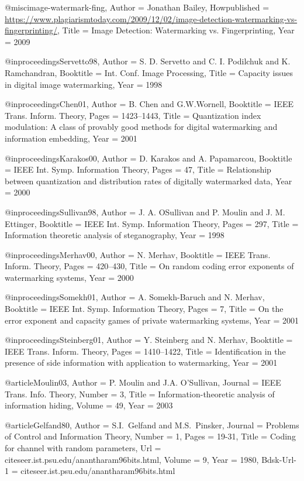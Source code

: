 {{@misc{image-watermark-fing,
	Author = {Jonathan Bailey},
	Howpublished = {\url{https://www.plagiarismtoday.com/2009/12/02/image-detection-watermarking-vs-fingerprinting/}},
	Title = {{Image Detection: Watermarking vs. Fingerprinting}},
	Year = {2009}}

@inproceedings{Servetto98,
	Author = {S. D. Servetto and C. I. Podilchuk and K. Ramchandran},
	Booktitle = {Int. Conf. Image Processing},
	Title = {Capacity issues in digital image watermarking},
	Year = {1998}}

@inproceedings{Chen01,
	Author = {B. Chen and G.W.Wornell},
	Booktitle = {IEEE Trans. Inform. Theory},
	Pages = {1423--1443},
	Title = {Quantization index modulation: A class of provably good methods for digital watermarking and information embedding},
	Year = {2001}}

@inproceedings{Karakos00,
	Author = {D. Karakos and A. Papamarcou},
	Booktitle = {IEEE Int. Symp. Information Theory},
	Pages = {47},
	Title = {Relationship between quantization and distribution rates of digitally watermarked data},
	Year = {2000}}

@inproceedings{Sullivan98,
	Author = {J. A. OSullivan and P. Moulin and J. M. Ettinger},
	Booktitle = {IEEE Int. Symp. Information Theory},
	Pages = {297},
	Title = {Information theoretic analysis of steganography},
	Year = {1998}}

@inproceedings{Merhav00,
	Author = {N. Merhav},
	Booktitle = {IEEE Trans. Inform. Theory},
	Pages = {420--430},
	Title = {On random coding error exponents of watermarking systems},
	Year = {2000}}

@inproceedings{Somekh01,
	Author = {A. Somekh-Baruch and N. Merhav},
	Booktitle = {IEEE Int. Symp. Information Theory},
	Pages = {7},
	Title = {On the error exponent and capacity games of private watermarking systems},
	Year = {2001}}

@inproceedings{Steinberg01,
	Author = {Y. Steinberg and N. Merhav},
	Booktitle = {IEEE Trans. Inform. Theory},
	Pages = {1410--1422},
	Title = {Identification in the presence of side information with application to watermarking},
	Year = {2001}}

@article{Moulin03,
	Author = {P. Moulin and J.A. O'Sullivan},
	Journal = {IEEE Trans. Info. Theory},
	Number = {3},
	Title = {Information-theoretic analysis of information hiding},
	Volume = 49,
	Year = 2003}

@article{Gelfand80,
	Author = {S.I.~Gelfand and M.S.~Pinsker},
	Journal = {Problems of Control and Information Theory},
	Number = {1},
	Pages = {19-31},
	Title = {{Coding for channel with random parameters}},
	Url = {citeseer.ist.psu.edu/anantharam96bits.html},
	Volume = {9},
	Year = {1980},
	Bdsk-Url-1 = {citeseer.ist.psu.edu/anantharam96bits.html}}

}}
